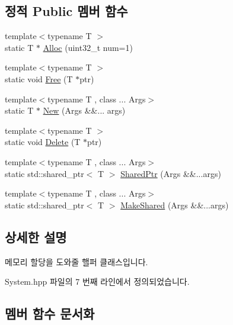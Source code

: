 \subsection*{정적 Public 멤버 함수}
\begin{DoxyCompactItemize}
\item 
{\footnotesize template$<$typename T $>$ }\\static T $\ast$ \hyperlink{classcpf_1_1_allocator_a3481cae5807aa57faf8ac9157bd5c618}{Alloc} (uint32\+\_\+t num=1)
\item 
{\footnotesize template$<$typename T $>$ }\\static void \hyperlink{classcpf_1_1_allocator_af63eadbfa53045d7eede980fd5d15eb4}{Free} (T $\ast$ptr)
\item 
{\footnotesize template$<$typename T , class ... Args$>$ }\\static T $\ast$ \hyperlink{classcpf_1_1_allocator_ab224979f67fae21e9db39b211a67b2e9}{New} (Args \&\&... args)
\item 
{\footnotesize template$<$typename T $>$ }\\static void \hyperlink{classcpf_1_1_allocator_a6c7808c532c47dc997deaf296aae4f27}{Delete} (T $\ast$ptr)
\item 
{\footnotesize template$<$typename T , class ... Args$>$ }\\static std\+::shared\+\_\+ptr$<$ T $>$ \hyperlink{classcpf_1_1_allocator_a60701a3cdd64b6feb7d0b1643200b412}{Shared\+Ptr} (Args \&\&...args)
\item 
{\footnotesize template$<$typename T , class ... Args$>$ }\\static std\+::shared\+\_\+ptr$<$ T $>$ \hyperlink{classcpf_1_1_allocator_a3dc750d11bdf4c19e498fd855bcf8c70}{Make\+Shared} (Args \&\&...args)
\end{DoxyCompactItemize}


\subsection{상세한 설명}
메모리 할당을 도와줄 핼퍼 클래스입니다. 

System.\+hpp 파일의 7 번째 라인에서 정의되었습니다.



\subsection{멤버 함수 문서화}
\mbox{\label{classcpf_1_1_allocator_a3481cae5807aa57faf8ac9157bd5c618}} 
